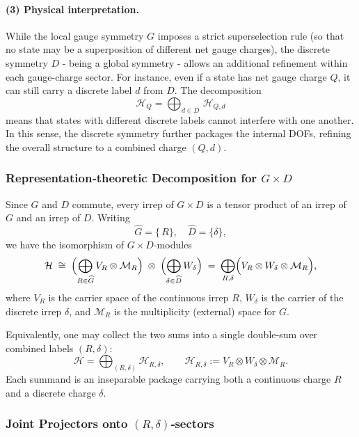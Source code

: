 \documentclass[12pt,a4paper]{article}
\begin{document}
\paragraph{(3) Physical interpretation.}
While the local gauge symmetry $G$ imposes a strict superselection rule (so that no state may be a superposition of different net gauge charges), the discrete symmetry $D$ - being a global symmetry - allows an additional refinement within each gauge-charge sector.
For instance, even if a state has net gauge charge $Q$, it can still carry a discrete label $d$ from $D$.
The decomposition
\[
\mathcal{H}_Q = \bigoplus_{d\in D}\, \mathcal{H}_{Q,d}
\]
means that states with different discrete labels cannot interfere with one another.
In this sense, the discrete symmetry further packages the internal DOFs, refining the overall structure to a combined charge $(Q,d)$.



\subsubsection{Representation‐theoretic Decomposition for $G\times D$}
\label{sec:GD-decomp}

Since $G$ and $D$ commute, every irrep of $G\times D$ is a tensor product of an irrep of $G$ and an irrep of $D$.
Writing
\[
\widehat G=\{\,R\},\quad \widehat D=\{\delta\},
\]
we have the isomorphism of $G\times D$‐modules
\[
\mathcal H
\;\cong\;
\Bigl(\bigoplus_{R\in\widehat G}V_R\otimes\mathcal M_R\Bigr)
\;\otimes\;
\Bigl(\bigoplus_{\delta\in\widehat D}W_\delta\Bigr)
\;=\;
\bigoplus_{R,\delta}
\Bigl(V_R\otimes W_\delta\otimes\mathcal M_R\Bigr),
\]
where
$V_R$ is the carrier space of the continuous irrep $R$,  
$W_\delta$ is the carrier of the discrete irrep $\delta$,  
and $\mathcal M_R$ is the multiplicity (external) space for $G$.  


Equivalently, one may collect the two sums into a single double‐sum over combined labels $(R,\delta)$:
\[
\mathcal H
=\bigoplus_{(R,\delta)}
\mathcal H_{R,\delta},
\qquad
\mathcal H_{R,\delta}
:=V_R\otimes W_\delta\otimes \mathcal M_R.
\]
Each summand is an inseparable package carrying both a continuous charge $R$ and a discrete charge $\delta$.



\subsubsection{Joint Projectors onto $(R,\delta)$‐sectors}
\label{sec:GD-projector}
\end{document}
